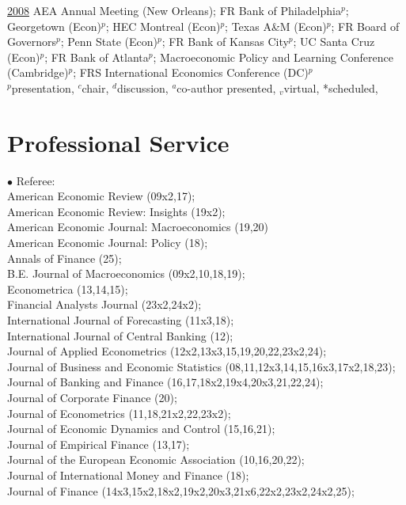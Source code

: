 \documentclass[margin,line,12pt]{res}
\begin{document}
\begin{resume}
\underline{2008} AEA Annual Meeting (New Orleans); FR Bank of Philadelphia$^p$; Georgetown (Econ)$^p$; HEC Montreal (Econ)$^p$; Texas A\&M (Econ)$^p$; FR Board of Governors$^p$; Penn State (Econ)$^p$; FR Bank of Kansas City$^p$; UC Santa Cruz (Econ)$^p$; FR Bank of Atlanta$^p$; Macroeconomic Policy and Learning Conference (Cambridge)$^p$; FRS International Economics Conference (DC)$^p$\\
{\footnotesize $^p$presentation, $^c$chair, $^d$discussion, $^a$co-author presented, $_v$virtual, *scheduled, }


\section{\sc\small Professional Service}
$\bullet$ Referee: \\
American Economic Review (09x2,17);\\
American Economic Review: Insights (19x2);\\
American Economic Journal: Macroeconomics (19,20)\\
American Economic Journal: Policy (18);\\
Annals of Finance (25);\\
B.E. Journal of Macroeconomics (09x2,10,18,19);\\
Econometrica (13,14,15);\\
Financial Analysts Journal (23x2,24x2);\\
International Journal of Forecasting (11x3,18);\\
International Journal of Central Banking (12);\\
Journal of Applied Econometrics (12x2,13x3,15,19,20,22,23x2,24);\\
Journal of Business and Economic Statistics (08,11,12x3,14,15,16x3,17x2,18,23);\\
Journal of Banking and Finance (16,17,18x2,19x4,20x3,21,22,24);\\
Journal of Corporate Finance (20);\\
Journal of Econometrics (11,18,21x2,22,23x2);\\
Journal of Economic Dynamics and Control (15,16,21);\\
Journal of Empirical Finance (13,17);\\
Journal of the European Economic Association (10,16,20,22);\\
Journal of International Money and Finance (18);\\
Journal of Finance (14x3,15x2,18x2,19x2,20x3,21x6,22x2,23x2,24x2,25);\\

\end{resume}
\end{document}
